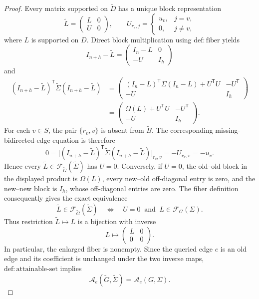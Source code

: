 \documentclass{article}
\begin{document}
\begin{proof}
Every matrix supported on \(\widetilde D\) has a unique block representation
\[
\widetilde L=
\begin{pmatrix}
L&0\\
U&0
\end{pmatrix},
\qquad
U_{r_v,j}=
\begin{cases}
u_v,&j=v,\\
0,&j\ne v,
\end{cases}
\]
where \(L\) is supported on \(D\). Direct block multiplication using \(\mathrm{def:fiber}\) yields
\[
I_{n+h}-\widetilde L=
\begin{pmatrix}
I_n-L&0\\
-U&I_h
\end{pmatrix}
\]
and
\[
\begin{aligned}
(I_{n+h}-\widetilde L)^{\mathsf T}
\widetilde\Sigma
(I_{n+h}-\widetilde L)
&=
\begin{pmatrix}
(I_n-L)^{\mathsf T}\Sigma(I_n-L)+U^{\mathsf T}U&-U^{\mathsf T}\\
-U&I_h
\end{pmatrix}\\
&=
\begin{pmatrix}
\Omega(L)+U^{\mathsf T}U&-U^{\mathsf T}\\
-U&I_h
\end{pmatrix}.
\end{aligned}
\]
For each \(v\in S\), the pair \(\{r_v,v\}\) is absent from \(\widetilde B\). The corresponding missing-bidirected-edge equation is therefore
\[
0=\bigl[(I_{n+h}-\widetilde L)^{\mathsf T}
\widetilde\Sigma(I_{n+h}-\widetilde L)\bigr]_{r_v,v}
=-U_{r_v,v}=-u_v.
\]
Hence every \(\widetilde L\in\mathcal F_{\widetilde G}(\widetilde\Sigma)\) has \(U=0\). Conversely, if \(U=0\), the old--old block in the displayed product is \(\Omega(L)\), every new--old off-diagonal entry is zero, and the new--new block is \(I_h\), whose off-diagonal entries are zero. The fiber definition consequently gives the exact equivalence
\[
\widetilde L\in\mathcal F_{\widetilde G}(\widetilde\Sigma)
\quad\Longleftrightarrow\quad
U=0\ \text{ and }\ L\in\mathcal F_G(\Sigma).
\]
Thus restriction \(\widetilde L\mapsto L\) is a bijection with inverse
\[
L\longmapsto
\begin{pmatrix}
L&0\\
0&0
\end{pmatrix}.
\]
In particular, the enlarged fiber is nonempty. Since the queried edge \(e\) is an old edge and its coefficient is unchanged under the two inverse maps, \(\mathrm{def:attainable\mbox{-}set}\) implies
\[
\mathcal A_e(\widetilde G,\widetilde\Sigma)
=\mathcal A_e(G,\Sigma).
\]


\end{proof}
\end{document}
